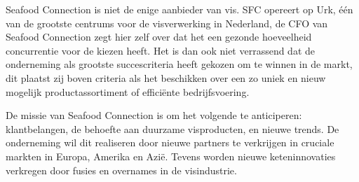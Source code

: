 Seafood Connection is niet de enige aanbieder van vis. SFC opereert op Urk, één van de grootste centrums voor de visverwerking in Nederland, de CFO van Seafood Connection zegt hier zelf over dat het een gezonde hoeveelheid concurrentie voor de kiezen heeft. Het is dan ook niet verrassend dat de onderneming als grootste succescriteria heeft gekozen om te winnen in de markt, dit plaatst zij boven criteria als het beschikken over een zo uniek en nieuw mogelijk productassortiment of efficiënte bedrijfsvoering. 

De missie van Seafood Connection is om het volgende te anticiperen: klantbelangen, de behoefte aan duurzame visproducten, en nieuwe trends. De onderneming wil dit realiseren door nieuwe partners te verkrijgen in cruciale markten in Europa, Amerika en Azië. Tevens worden nieuwe keteninnovaties verkregen door fusies en overnames in de visindustrie. \citep{sfcwebsite}